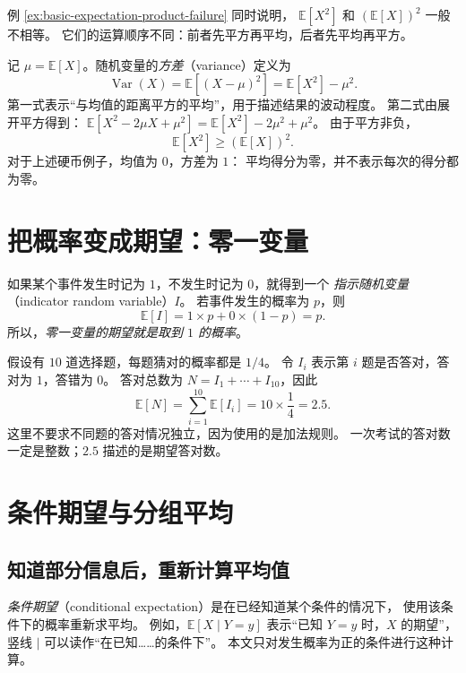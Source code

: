 \documentclass[UTF8,12pt,a4paper,fontset=fandol]{ctexart}
\begin{document}
例 \ref{ex:basic-expectation-product-failure} 同时说明，
$\mathbb E[X^2]$ 和 $(\mathbb E[X])^2$ 一般不相等。
它们的运算顺序不同：前者先平方再平均，后者先平均再平方。

记 $\mu=\mathbb E[X]$。随机变量的\emph{方差}（variance）定义为
\begin{equation}
  \operatorname{Var}(X)
  =\mathbb E[(X-\mu)^2]
  =\mathbb E[X^2]-\mu^2.
  \label{eq:basic-expectation-variance}
\end{equation}
第一式表示“与均值的距离平方的平均”，用于描述结果的波动程度。
第二式由展开平方得到：
$\mathbb E[X^2-2\mu X+\mu^2]
=\mathbb E[X^2]-2\mu^2+\mu^2$。
由于平方非负，
\[
  \mathbb E[X^2]\geq(\mathbb E[X])^2.
\]
对于上述硬币例子，均值为 $0$，方差为 $1$：
平均得分为零，并不表示每次的得分都为零。

\section{把概率变成期望：零一变量}
\label{sec:basic-expectation-indicators}

如果某个事件发生时记为 $1$，不发生时记为 $0$，就得到一个
\emph{指示随机变量}（indicator random variable）$I$。
若事件发生的概率为 $p$，则
\begin{equation}
  \mathbb E[I]=1\times p+0\times(1-p)=p.
  \label{eq:basic-expectation-indicator}
\end{equation}
所以，\emph{零一变量的期望就是取到 $1$ 的概率}。

\begin{example}[猜选择题的期望答对数]
假设有 $10$ 道选择题，每题猜对的概率都是 $1/4$。
令 $I_i$ 表示第 $i$ 题是否答对，答对为 $1$，答错为 $0$。
答对总数为 $N=I_1+\cdots+I_{10}$，因此
\[
  \mathbb E[N]
  =\sum_{i=1}^{10}\mathbb E[I_i]
  =10\times\frac14=2.5.
\]
这里不要求不同题的答对情况独立，因为使用的是加法规则。
一次考试的答对数一定是整数；$2.5$ 描述的是期望答对数。
\end{example}

\section{条件期望与分组平均}
\label{sec:basic-expectation-conditioning}

\subsection{知道部分信息后，重新计算平均值}

\emph{条件期望}（conditional expectation）是在已经知道某个条件的情况下，
使用该条件下的概率重新求平均。
例如，$\mathbb E[X\mid Y=y]$ 表示“已知 $Y=y$ 时，$X$ 的期望”，
竖线 $\mid$ 可以读作“在已知……的条件下”。
本文只对发生概率为正的条件进行这种计算。
\end{document}
